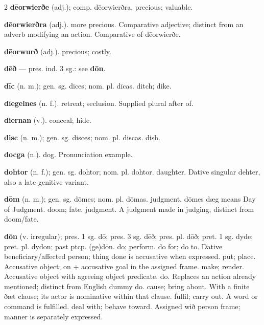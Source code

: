 \begin{multicols*}{2}
\textbf{dēorwierðe} (adj.); comp. dēorwierðra. precious; valuable.\par
\textbf{dēorwierðra} (adj.). more precious. Comparative adjective; distinct from an adverb modifying an action. Comparative of dēorwierðe.\par
\textbf{dēorwurð} (adj.). precious; costly.\par
\textbf{dēð} — pres. ind. 3 sg.: see \textbf{dōn}.\par
\textbf{dīc} (n. m.); gen. sg. dīces; nom. pl. dīcas. ditch; dike.\par
\textbf{dīegelnes} (n. f.). retreat; seclusion. Supplied plural after of.\par
\textbf{diernan} (v.). conceal; hide.\par
\textbf{disc} (n. m.); gen. sg. disces; nom. pl. discas. dish.\par
\textbf{docga} (n.). dog. Pronunciation example.\par
\textbf{dohtor} (n. f.); gen. sg. dohtor; nom. pl. dohtor. daughter. Dative singular dehter, also a late genitive variant.\par
\textbf{dōm} (n. m.); gen. sg. dōmes; nom. pl. dōmas. judgment. dōmes dæg means Day of Judgment. doom; fate. judgment. A judgment made in judging, distinct from doom/fate.\par
\textbf{dōn} (v. irregular); pres. 1 sg. dō; pres. 3 sg. dēð; pres. pl. dōð; pret. 1 sg. dyde; pret. pl. dydon; past ptcp. (ge)dōn. do; perform. do for; do to. Dative beneficiary/affected person; thing done is accusative when expressed. put; place. Accusative object; on + accusative goal in the assigned frame. make; render. Accusative object with agreeing object predicate. do. Replaces an action already mentioned; distinct from English dummy do. cause; bring about. With a finite ðæt clause; its actor is nominative within that clause. fulfil; carry out. A word or command is fulfilled. deal with; behave toward. Assigned wið person frame; manner is separately expressed.\par

\end{multicols*}
